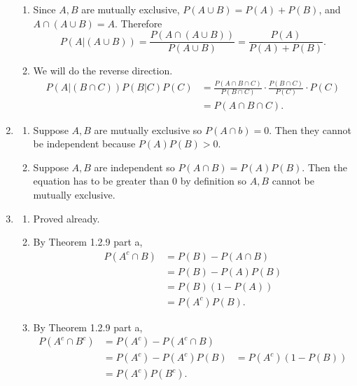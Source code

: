 \documentclass{article}
\begin{document}
\begin{enumerate}
\begin{enumerate}
        \item Since $A, B$ are mutually exclusive, $P(A \cup B) = P(A) + P(B)$, and
        $A \cap (A \cup B) = A$. Therefore
        \[ P(A|(A \cup B)) = \frac{P(A \cap (A \cup B))}{P(A \cup B)}
        = \frac{P(A)}{P(A) + P(B)}. \]

        \item We will do the reverse direction.
        \begin{align*}
            P(A|(B \cap C))P(B|C)P(C)
            &= \frac{P(A \cap B \cap C)}{P(B \cap C)} \cdot \frac{P(B \cap C)}{P(C)}
            \cdot P(C) \\
            &= P(A \cap B \cap C).
        \end{align*}
    \end{enumerate}

    \item \begin{enumerate}
        \item Suppose $A, B$ are mutually exclusive so $P(A \cap b) = 0$. Then they cannot be
        independent because $P(A)P(B) > 0$.

        \item Suppose $A, B$ are independent so $P(A \cap B) = P(A)P(B)$. Then the equation
        has to be greater than 0 by definition so $A, B$ cannot be mutually exclusive.
    \end{enumerate}

    \item \begin{enumerate}
        \item Proved already.

        \item By Theorem 1.2.9 part a,
        \begin{align*}
            P(A^c \cap B)
            &= P(B) - P(A \cap B) \\
            &= P(B) - P(A)P(B) \\
            &= P(B)(1 - P(A)) \\
            &= P(A^{c})P(B).
        \end{align*}

        \item By Theorem 1.2.9 part a,
        \begin{align*}
            P(A^c \cap B^c)
            &= P(A^c) - P(A^c \cap B) \\
            &= P(A^{c}) - P(A^{c})P(B)
            &= P(A^{c})(1 - P(B)) \\
            &= P(A^{c})P(B^{c}).
        \end{align*}
    \end{enumerate}


\end{enumerate}
\end{document}
